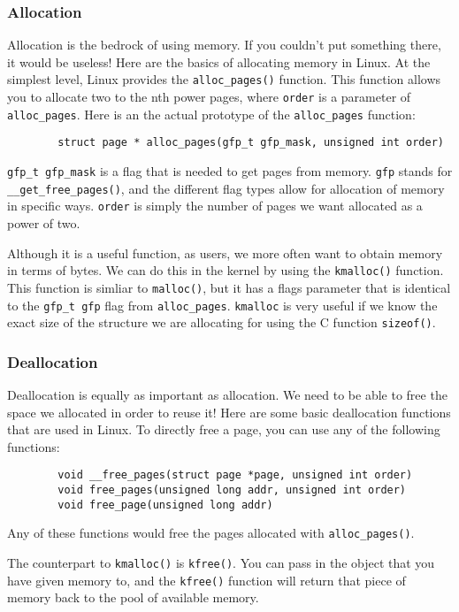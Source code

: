 \documentclass[10pt,letterpaper,onecolumn,draftclsnofoot]{IEEEtran}
\begin{document}
	\subsubsection{Allocation}
	Allocation is the bedrock of using memory. If you couldn't put something
	there, it would be useless! Here are the basics of allocating memory in
	Linux. At the simplest level, Linux provides the \texttt{alloc\_pages()}
	function. This function allows you to allocate two to the nth power pages,
	where \texttt{order} is a parameter of \texttt{alloc\_pages}. Here is an
	the actual prototype of the \texttt{alloc\_pages} function:
	\begin{lstlisting}
		struct page * alloc_pages(gfp_t gfp_mask, unsigned int order)
	\end{lstlisting}
	\texttt{gfp\_t gfp\_mask} is a flag that is needed to get pages from memory.
	\texttt{gfp} stands for \texttt{\_\_get\_free\_pages()}, and the different
	flag types allow for allocation of memory in specific ways.\cite{robertlove2010}
	\texttt{order} is simply the number of pages we want allocated as a power
	of two.

	Although it is a useful function, as users, we more often want to obtain
	memory in terms of bytes. We can do this in the kernel by using the
	\texttt{kmalloc()} function. This function is simliar to \texttt{malloc()},
	but it has a flags parameter that is identical to the \texttt{gfp\_t gfp}
	flag from \texttt{alloc\_pages}. \texttt{kmalloc} is very useful if we
	know the exact size of the structure we are allocating for using the C
	function \texttt{sizeof()}. 

	\subsubsection{Deallocation}
	Deallocation is equally as important as allocation. We need to be able
	to free the space we allocated in order to reuse it! Here are some basic
	deallocation functions that are used in Linux. To directly free a page,
	you can use any of the following functions:
	\begin{lstlisting}
		void __free_pages(struct page *page, unsigned int order)
		void free_pages(unsigned long addr, unsigned int order)
		void free_page(unsigned long addr)
	\end{lstlisting}
	Any of these functions would free the pages allocated with \texttt{alloc\_pages()}.

	The counterpart to \texttt{kmalloc()} is \texttt{kfree()}. You can pass
	in the object that you have given memory to, and the \texttt{kfree()} function
	will return that piece of memory back to the pool of available memory.
\end{document}
